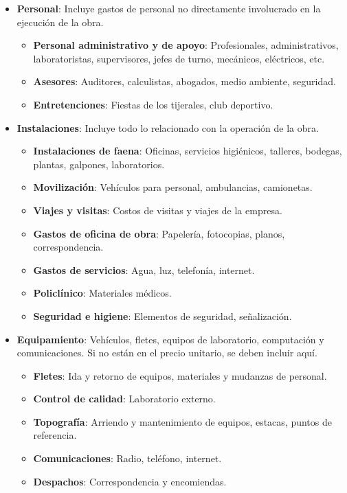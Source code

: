 \begin{itemize}
    \item \textbf{Personal}: Incluye gastos de personal no directamente involucrado en la ejecución de la obra.
    \begin{itemize}
        \item \textbf{Personal administrativo y de apoyo}: Profesionales, administrativos, laboratoristas, supervisores, jefes de turno, mecánicos, eléctricos, etc.
        \item \textbf{Asesores}: Auditores, calculistas, abogados, medio ambiente, seguridad.
        \item \textbf{Entretenciones}: Fiestas de los tijerales, club deportivo.
    \end{itemize}
    
    \item \textbf{Instalaciones}: Incluye todo lo relacionado con la operación de la obra.
    \begin{itemize}
        \item \textbf{Instalaciones de faena}: Oficinas, servicios higiénicos, talleres, bodegas, plantas, galpones, laboratorios.
        \item \textbf{Movilización}: Vehículos para personal, ambulancias, camionetas.
        \item \textbf{Viajes y visitas}: Costos de visitas y viajes de la empresa.
        \item \textbf{Gastos de oficina de obra}: Papelería, fotocopias, planos, correspondencia.
        \item \textbf{Gastos de servicios}: Agua, luz, telefonía, internet.
        \item \textbf{Policlínico}: Materiales médicos.
        \item \textbf{Seguridad e higiene}: Elementos de seguridad, señalización.
    \end{itemize}
    
    \item \textbf{Equipamiento}: Vehículos, fletes, equipos de laboratorio, computación y comunicaciones. Si no están en el precio unitario, se deben incluir aquí.
    \begin{itemize}
        \item \textbf{Fletes}: Ida y retorno de equipos, materiales y mudanzas de personal.
        \item \textbf{Control de calidad}: Laboratorio externo.
        \item \textbf{Topografía}: Arriendo y mantenimiento de equipos, estacas, puntos de referencia.
        \item \textbf{Comunicaciones}: Radio, teléfono, internet.
        \item \textbf{Despachos}: Correspondencia y encomiendas.
    \end{itemize}
\end{itemize}

